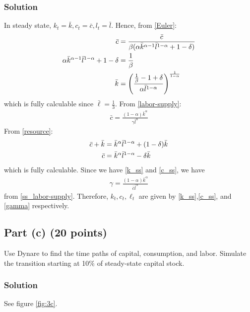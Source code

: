\documentclass[12pt]{article}
\begin{document}
\subsubsection*{Solution}
In steady state, $k_t = \bar{k} , c_t = \bar{c}, l_t = \bar{l}$. Hence, from \eqref{Euler}:
\begin{align}
     \bar{c} &= \frac{\bar{c} }{ \beta( \alpha \bar{k}^{\alpha-1} \bar{l}^{1-\alpha} +1-\delta)} \notag
     \\  \alpha \bar{k}^{\alpha-1} \bar{l}^{1-\alpha} +1-\delta &=  \frac{1}{\beta}\notag
     \\  \bar{k} &=  \left(\frac{\frac{1}{\beta} -1+\delta }{\alpha  \bar{l}^{1-\alpha}}\right)^{\frac{1}{1-\alpha}}\label{k_ss}
\end{align}
which is fully calculable since $ \bar{\ell} = \frac{1}{3}.$ From \eqref{labor-supply}:
\begin{align}
    \bar{c} = \frac{(1-\alpha)\bar{k}^\alpha }{\gamma \bar{l}^{\alpha}} \label{ss_labor-supply}
\end{align}
From \eqref{resource}:
\begin{align}
    \bar{c} + \bar{k} &= \bar{k}^\alpha \bar{l}^{1-\alpha}  + (1-\delta) \bar{k}\notag
    \\ \bar{c} &=  \bar{k}^\alpha \bar{l}^{1-\alpha}  -\delta \bar{k} \label{c_ss}
\end{align}
which is fully calculable. Since we have \eqref{k_ss} and \eqref{c_ss}, we have
\begin{align}
     \gamma= \frac{(1-\alpha)\bar{k}^\alpha }{ \bar{c}\bar{l}^{\alpha}} \label{gamma}
\end{align}
from \eqref{ss_labor-supply}. Therefore, $k_t, c_t, \ell_t $ are given by \eqref{k_ss},\eqref{c_ss}, and \eqref{gamma} respectively.

\subsection*{Part (c) (20 points)}
Use Dynare to find the time paths of capital, consumption, and labor. Simulate the transition starting at 10\% of steady-state capital stock.

\subsubsection*{Solution}
See figure \eqref{fig:3c}.
\end{document}
